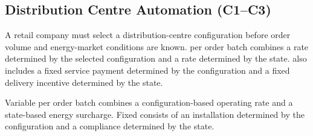 
\subsection{Distribution Centre Automation (C1--C3)}
\label{sec:problem20-distribution-centre-automation-c1-c3}

A retail company must select a distribution-centre configuration before order
volume and energy-market conditions are known.  per order batch combines
a rate determined by the selected configuration and a rate determined by the
state.  also includes a fixed service payment determined by the
configuration and a fixed delivery incentive determined by the state.

Variable  per order batch combines a configuration-based operating rate and
a state-based energy surcharge. Fixed  consists of an installation 
determined by the configuration and a compliance  determined by the state.

